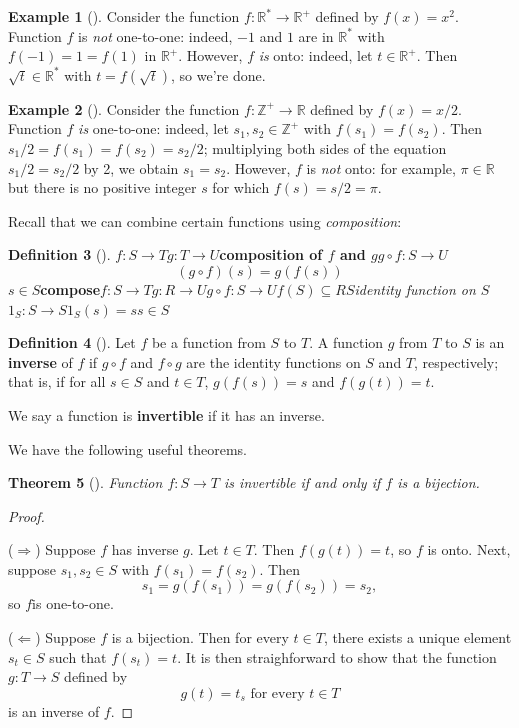 \documentclass[10pt,]{book}
\newcommand{\terminology}[1]{\textbf{#1}}
\theoremstyle{plain}
\newtheorem{theorem}{Theorem}[section]
\theoremstyle{definition}
\newtheorem{definition}[theorem]{Definition}
\theoremstyle{definition}
\theoremstyle{definition}
\newtheorem{example}[theorem]{Example}
\theoremstyle{definition}
\numberwithin{equation}{section}
\def\Z{\mathbb{Z}}
\def\R{\mathbb{R}}
\begin{document}
\begin{example}[]\label{example-6}
Consider the function \(f: \R^* \to \R^+\) defined by \(f(x)=x^2\). Function \(f\) is \emph{not} one-to-one: indeed, \(-1\) and \(1\) are in \(\R^*\) with \(f(-1)=1=f(1)\) in \(\R^+\). However, \(f\) \emph{is} onto: indeed, let \(t\in \R^+\). Then \(\sqrt{t} \in \R^*\) with \(t=f(\sqrt{t})\), so we're done.%
\end{example}
\begin{example}[]\label{example-7}
Consider the function \(f: \Z^+ \to \R\) defined by \(f(x)=x/2\). Function \(f\) \emph{is} one-to-one: indeed, let \(s_1, s_2 \in \Z^+\) with \(f(s_1)=f(s_2)\). Then \(s_1/2=f(s_1)=f(s_2)=s_2/2\); multiplying both sides of the equation \(s_1/2=s_2/2\) by 2, we obtain \(s_1=s_2\). However, \(f\) is \emph{not} onto: for example, \(\pi\in \R\) but there is no positive integer \(s\) for which \(f(s)=s/2=\pi\).%
\end{example}
Recall that we can combine certain functions using \emph{composition}:%
\begin{definition}[{}]\label{definition-9}
\(f:S\to T\)\(g:T\to U\)\terminology{composition of \(f\) and \(g\)}\(g\circ f: S\to U\)%
\begin{equation*}
(g\circ f)(s)=g(f(s))
\end{equation*}
\(s\in S\)\terminology{compose}\(f:S\to T\)\(g:R\to U\)\(g\circ f:S\to U\)\(f(S)\subseteq R\)\(S\)\emph{identity function on \(S\)}\(1_S: S\to S\)\(1_S(s)=s\)\(s\in S\)\label{notation-24}
\label{notation-25}
\end{definition}
\begin{definition}[{}]\label{definition-10}
Let \(f\) be a function from \(S\) to \(T\). A function \(g\) from \(T\) to \(S\) is an \terminology{inverse} of \(f\) if \(g\circ f\) and \(f\circ g\) are the identity functions on \(S\) and \(T\), respectively; that is, if for all \(s\in S\) and \(t\in
T\), \(g(f(s))=s\) and \(f(g(t))=t\).%
\par
We say a function is \terminology{invertible} if it has an inverse.%
\end{definition}
We have the following useful theorems.%
\begin{theorem}[{}]\label{invbij}
Function \(f:S\to T\) is invertible if and only if \(f\) is a bijection.%
\end{theorem}
\begin{proof}\hypertarget{proof-1}{}
(\(\Rightarrow\)) Suppose \(f\) has inverse \(g\). Let \(t\in T\). Then \(f(g(t))=t\), so \(f\) is onto.  Next, suppose \(s_1,s_2\in S\) with \(f(s_1)=f(s_2)\). Then%
\begin{equation*}
s_1=g(f(s_1))=g(f(s_2))=s_2,
\end{equation*}
so \(f\)is one-to-one.%
\par
(\(\Leftarrow\)) Suppose \(f\) is a bijection.  Then for every \(t\in T\), there exists a unique element \(s_t\in S\) such that \(f(s_t)=t\). It is then straighforward to show that the function \(g:T\to S\) defined by%
\begin{equation*}
g(t)=t_s \text{ for every }t\in T
\end{equation*}
is an inverse of \(f\).%
\end{proof}
\end{document}
